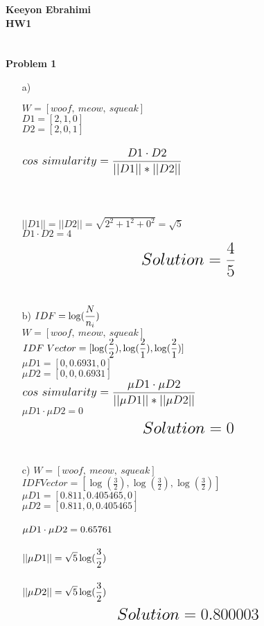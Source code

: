 \documentclass[ruled]{article}
\begin{document}
\textbf{Keeyon Ebrahimi}\\
\textbf{HW1}\\ \\ \\
\textbf{Problem 1}
\begin{itemize}
\item[a) ]

$W = [woof,\ meow,\ squeak]$ \\
$D1 = [2, 1, 0] $ \\
$D2 = [2, 0, 1]$\\ \\
$\mathlarger{\mathlarger{cos\ simularity = \frac{D1 \cdot D2}{||D1|| * ||D2||}}}$
\\ \\ \\ \\
$||D1|| = ||D2|| = \sqrt{2^2 + 1^2 + 0^2} = \sqrt{5}$\\
$D1 \cdot D2 = 4$\\
$$\mathlarger{\mathlarger{\mathlarger{Solution = \frac{4}{5}}}}$$\\
\item[b) ]
$IDF = \mathlarger{\log (\frac{N}{n_i}})$\\
$W = [woof,\ meow,\ squeak]$ \\
$IDF\ Vector = [ \mathlarger{\log (\frac{2}{2}), \log (\frac{2}{1}), \log (\frac{2}{1}) ]}$\\
$\mu D1 = [0, 0.6931, 0] $\\
$\mu D2 = [0, 0, 0.6931]$ \\
$\mathlarger{\mathlarger{cos\ simularity = \frac{\mu D1 \cdot \mu D2}{||\mu D1|| * ||\mu D2||}}}$\\
$\mu D1 \cdot \mu D2 = 0$\\
$$\mathlarger{\mathlarger{\mathlarger{Solution = 0}}}$$\\
\item[c) ]
$W = [woof,\ meow,\ squeak]$ \\
$IDF Vector = [\log (\frac{3}{2}), \log (\frac{3}{2}), \log (\frac{3}{2})]$\\
$\mu D1 = [0.811, 0.405465, 0]$\\
$\mu D2 = [0.811, 0, 0.405465]$\\ \\
$\mathlarger{ \mu D1 \cdot \mu D2 = 0.65761}$\\ \\
$\mathlarger{ ||\mu D1|| = \sqrt{5} \log( \frac{3}{2})}$\\\\
$\mathlarger{ ||\mu D2|| = \sqrt{5} \log( \frac{3}{2})}$\\
$$\mathlarger{\mathlarger{\mathlarger{Solution = 0.800003}}}$$\\
\end{itemize}
\end{document}
